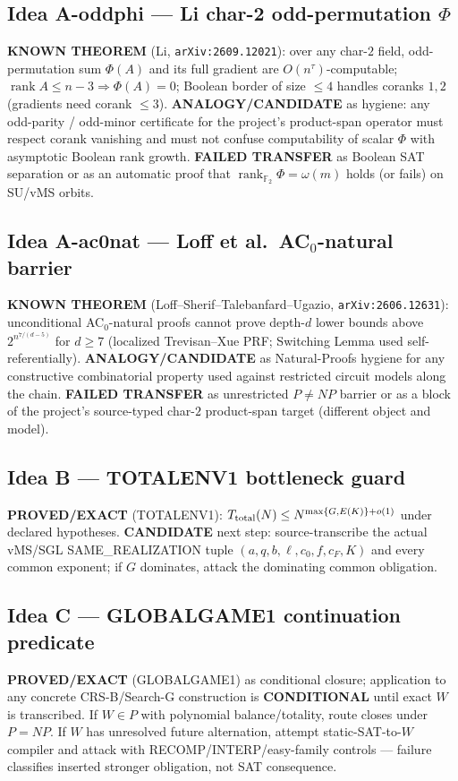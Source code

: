 \documentclass[11pt]{article}
\begin{document}
\subsection*{Idea A-oddphi --- Li char-2 odd-permutation $\Phi$}
\textbf{KNOWN THEOREM} (Li, \texttt{arXiv:2609.12021}): over any char-$2$ field,
odd-permutation sum $\Phi(A)$ and its full gradient are $O(n^{\tau})$-computable;
$\operatorname{rank}A\le n-3\Rightarrow\Phi(A)=0$; Boolean border of size $\le 4$
handles coranks $1,2$ (gradients need corank $\le 3$).
\textbf{ANALOGY/CANDIDATE} as hygiene: any odd-parity / odd-minor certificate for
the project's product-span operator must respect corank vanishing and must not
confuse computability of scalar $\Phi$ with asymptotic Boolean rank growth.
\textbf{FAILED TRANSFER} as Boolean SAT separation or as an automatic proof that
$\operatorname{rank}_{\mathbb F_2}\Phi=\omega(m)$ holds (or fails) on SU/vMS orbits.

\subsection*{Idea A-ac0nat --- Loff et al.\ AC$_0$-natural barrier}
\textbf{KNOWN THEOREM} (Loff--Sherif--Talebanfard--Ugazio,
\texttt{arXiv:2606.12631}): unconditional AC$_0$-natural proofs cannot prove
depth-$d$ lower bounds above $2^{n^{7/(d-5)}}$ for $d\ge 7$ (localized
Trevisan--Xue PRF; Switching Lemma used self-referentially).
\textbf{ANALOGY/CANDIDATE} as Natural-Proofs hygiene for any constructive
combinatorial property used against restricted circuit models along the chain.
\textbf{FAILED TRANSFER} as unrestricted $P\neq NP$ barrier or as a block of the
project's source-typed char-$2$ product-span target (different object and model).

\subsection*{Idea B --- TOTALENV1 bottleneck guard}
\textbf{PROVED/EXACT} (TOTALENV1): $T_{\rm total}(N)\le N^{\max\{G,E(K)\}+o(1)}$
under declared hypotheses. \textbf{CANDIDATE} next step: source-transcribe the
actual vMS/SGL SAME\_REALIZATION tuple $(a,q,b,\ell,c_0,f,c_F,K)$ and every
common exponent; if $G$ dominates, attack the dominating common obligation.

\subsection*{Idea C --- GLOBALGAME1 continuation predicate}
\textbf{PROVED/EXACT} (GLOBALGAME1) as conditional closure; application to any
concrete CRS-B/Search-G construction is \textbf{CONDITIONAL} until exact $W$
is transcribed. If $W\in P$ with polynomial balance/totality, route closes under
$P=NP$. If $W$ has unresolved future alternation, attempt static-SAT-to-$W$
compiler and attack with RECOMP/INTERP/easy-family controls --- failure classifies
inserted stronger obligation, not SAT consequence.
\end{document}
